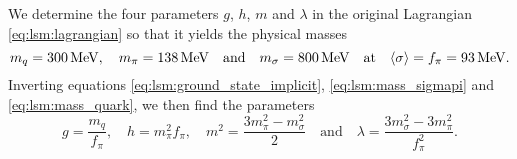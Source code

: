 We determine the four parameters $g$, $h$, $m$ and $\lambda$ in the original Lagrangian \eqref{eq:lsm:lagrangian} so that it yields the physical masses
\cite{ref:jo_lsm_renormalization}
\begin{equation}
	m_q = \SI{300}{\mega\electronvolt}, \quad
	m_\pi = \SI{138}{\mega\electronvolt} \quad \text{and} \quad
	m_\sigma = \SI{800}{\mega\electronvolt} \quad \text{at} \quad
	\langle \sigma \rangle = f_\pi = \SI{93}{\mega\electronvolt}.
\end{equation}
Inverting equations \eqref{eq:lsm:ground_state_implicit}, \eqref{eq:lsm:mass_sigmapi} and \eqref{eq:lsm:mass_quark}, we then find the parameters
\begin{equation}
	g       = \frac{m_q}{f_\pi}, \quad %
	h       = m_\pi^2 f_\pi, \quad %
	m^2     = \frac{3m_\pi^2 - m_\sigma^2}{2} \quad \text{and} \quad %
	\lambda = \frac{3 m_\sigma^2 - 3 m_\pi^2}{f_\pi^2} .    %
\label{eq:lsm:parameters}
\end{equation}

